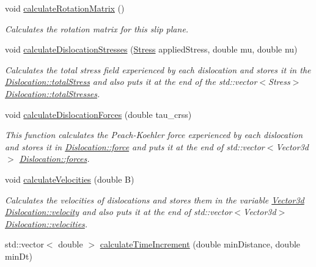 \begin{DoxyCompactItemize}
void \hyperlink{classSlipPlane_a5d9054f21be225f50860ad1351e3a86f}{calculate\-Rotation\-Matrix} ()
\begin{DoxyCompactList}\small\item\em \-Calculates the rotation matrix for this slip plane. \end{DoxyCompactList}\item 
void \hyperlink{classSlipPlane_a2d4d2d031502d4a6f0aebbad0990b882}{calculate\-Dislocation\-Stresses} (\hyperlink{classStress}{\-Stress} applied\-Stress, double mu, double nu)
\begin{DoxyCompactList}\small\item\em \-Calculates the total stress field experienced by each dislocation and stores it in the \hyperlink{classDislocation_ae27176c0d47fec3e188d7caa4c52f366}{\-Dislocation\-::total\-Stress} and also puts it at the end of the std\-::vector$<$\-Stress$>$ \hyperlink{classDislocation_adb36ed6c1772f2614ffbed4dcc748c13}{\-Dislocation\-::total\-Stresses}. \end{DoxyCompactList}\item 
void \hyperlink{classSlipPlane_ac16d1abbbc3b938b6f1f29a33a70212d}{calculate\-Dislocation\-Forces} (double tau\-\_\-crss)
\begin{DoxyCompactList}\small\item\em \-This function calculates the \-Peach-\/\-Koehler force experienced by each dislocation and stores it in \hyperlink{classDislocation_a9c19c7493d896bd845c489e1ec3cbbb6}{\-Dislocation\-::force} and puts it at the end of std\-::vector$<$\-Vector3d$>$ \hyperlink{classDislocation_aa8f4567bbfc6a58aaad01d5c423658c1}{\-Dislocation\-::forces}. \end{DoxyCompactList}\item 
void \hyperlink{classSlipPlane_aff7af69ba5235da6c8b142193509683c}{calculate\-Velocities} (double \-B)
\begin{DoxyCompactList}\small\item\em \-Calculates the velocities of dislocations and stores them in the variable \hyperlink{classVector3d}{\-Vector3d} \hyperlink{classDislocation_ad6f4e8e94b2525c2e58a77b9d2916c0e}{\-Dislocation\-::velocity} and also puts it at the end of std\-::vector$<$\-Vector3d$>$ \hyperlink{classDislocation_a9ccdef63384a8b965e70f13920a852f8}{\-Dislocation\-::velocities}. \end{DoxyCompactList}\item 
std\-::vector$<$ double $>$ \hyperlink{classSlipPlane_a255d67230132cf1c7bf18f61098a8b4f}{calculate\-Time\-Increment} (double min\-Distance, double min\-Dt)

\end{DoxyCompactItemize}
